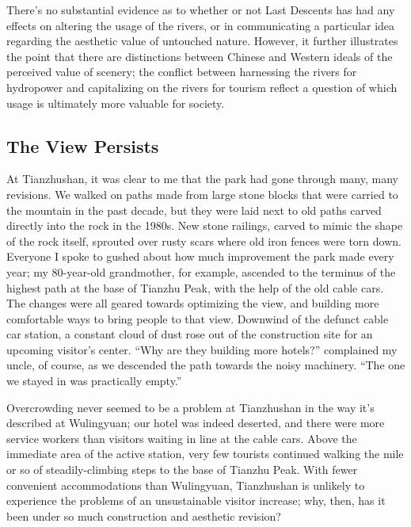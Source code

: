 There's no substantial evidence as to whether or not Last Descents has had any
effects on altering the usage of the rivers, or in communicating a particular
idea regarding the aesthetic value of untouched nature. However, it further illustrates
the point that there are distinctions between Chinese and Western ideals of the
perceived value of scenery; the conflict between harnessing the rivers for
hydropower and capitalizing on the rivers for tourism reflect a question of
which usage is ultimately more valuable for society.

\subsection*{The View Persists}

At Tianzhushan, it was clear to me that the park had gone through many, many
revisions. We walked on paths made from large stone blocks that were carried to
the mountain in the past decade, but they were laid next to old paths carved
directly into the rock in the 1980s. New stone railings, carved to mimic the
shape of the rock itself, sprouted over rusty scars where old iron fences were
torn down. Everyone I spoke to gushed about how much improvement the park made
every year; my 80-year-old grandmother, for example, ascended to the terminus
of the highest path at the base of Tianzhu Peak, with the help of the old cable
cars. The changes were all geared towards
optimizing the view, and building more comfortable ways to bring people to that view. Downwind
of the defunct cable car station, a constant cloud of dust rose out of the
construction site for an upcoming visitor's center. ``Why are they building more
hotels?'' complained my uncle, of course, as we descended the path towards the
noisy machinery. ``The one we stayed in was practically empty.''

Overcrowding never seemed to be a problem at Tianzhushan in the way it's
described at Wulingyuan; our hotel was indeed deserted, and there were more
service workers than visitors waiting in line at the cable cars. Above the
immediate area of the active station, very few tourists continued walking the
mile or so of steadily-climbing steps to the base of Tianzhu Peak. With fewer
convenient accommodations than Wulingyuan, Tianzhushan is unlikely to experience
the problems of an unsustainable visitor increase; why, then, has it been under
so much construction and aesthetic revision?

